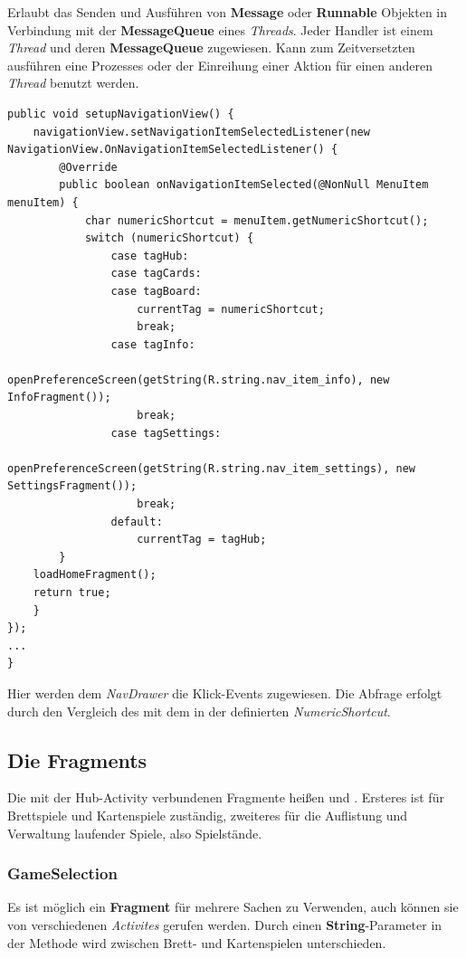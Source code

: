 \begin{infobox}[frametitle=Handler]
Erlaubt das Senden und Ausführen von \textbf{Message} oder \textbf{Runnable}
Objekten in Verbindung mit der \textbf{MessageQueue} eines \emph{Threads}. Jeder
Handler ist einem \emph{Thread} und deren \textbf{MessageQueue} zugewiesen.
Kann zum Zeitversetzten ausführen eine Prozesses oder der Einreihung einer
Aktion für einen anderen \emph{Thread} benutzt werden.
\end{infobox}

\begin{lstlisting}[caption={Hub setupNavigationView() Methode},captionpos=b]
public void setupNavigationView() {
	navigationView.setNavigationItemSelectedListener(new NavigationView.OnNavigationItemSelectedListener() {
		@Override
		public boolean onNavigationItemSelected(@NonNull MenuItem menuItem) {
			char numericShortcut = menuItem.getNumericShortcut();
			switch (numericShortcut) {
				case tagHub:
				case tagCards:
				case tagBoard:
					currentTag = numericShortcut;
					break;
				case tagInfo:
					openPreferenceScreen(getString(R.string.nav_item_info), new InfoFragment());
					break;
				case tagSettings:
					openPreferenceScreen(getString(R.string.nav_item_settings), new SettingsFragment());
					break;
				default:
					currentTag = tagHub;
		}
	loadHomeFragment();
	return true;
	}
});
...
}
\end{lstlisting}

Hier werden dem \emph{NavDrawer} die Klick-Events zugewiesen. Die Abfrage
erfolgt durch den Vergleich des  mit dem in der
 definierten \emph{NumericShortcut}.

\subsection{Die Fragments}

Die mit der Hub-Activity verbundenen Fragmente heißen  und
. Ersteres ist für Brettspiele und Kartenspiele zuständig, zweiteres
für die Auflistung und Verwaltung laufender Spiele, also Spielstände.

\subsubsection{GameSelection}

Es ist möglich ein \textbf{Fragment} für mehrere Sachen zu Verwenden, auch können
sie von verschiedenen \emph{Activites} gerufen werden. Durch einen
\textbf{String}-Parameter in der Methode  wird
zwischen Brett- und Kartenspielen unterschieden.

